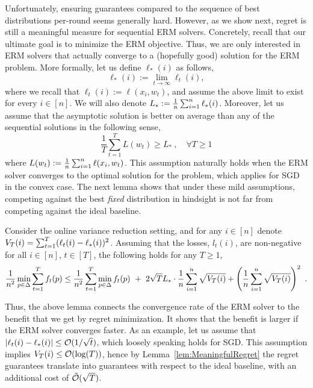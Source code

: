 Unfortunately, ensuring guarantees compared to the sequence of best distributions per-round seems generally hard.
However, as we show next, regret  is still a meaningful measure for sequential ERM solvers.
Concretely, recall that our ultimate goal is to minimize the ERM objective. Thus, we are only interested in ERM solvers that actually converge to a (hopefully good) solution for the ERM problem. More formally, let us define $\ell_*(i)$ as follows,
\begin{equation*}
 \ell_{*}(i):=\lim _{t\rightarrow \infty}\ell_t(i),
\end{equation*}
where we recall that $\ell_t(i) :=\ell(x_i,w_t)$, and assume the above  limit to exist for every $i\in[n]$.
We will also denote $L_*:= \frac{1}{n}\sum_{i=1}^n  \ell_{*}(i)$.
Moreover, let us assume that the asymptotic solution is better on average than any of the sequential solutions in the following sense,
\begin{equation*}
\frac{1}{T}\sum_{t=1}^T L(w_t) \geq L_*~,\quad \forall T\geq 1
\end{equation*}
where $L(w_t) := \frac{1}{n}\sum_{i=1}^n \ell(x_i,w_t)$.
This assumption naturally holds when the ERM solver converges to the optimal solution for the problem, which applies for SGD in the convex case.
The next lemma shows that under these mild assumptions,  competing against the best \emph{fixed}  distribution in hindsight is not  far from competing against the ideal baseline.%
\begin{lemma} \label{lem:MeaningfulRegret}
Consider the online variance reduction setting, and for any $i\in[n]$ denote \linebreak
$V_T(i)=\sum_{t=1}^T(\ell_t(i)-\ell_*(i))^2$. Assuming that the losses, $l_t(i)$, are non-negative for all $i \in [n]$, $t\in[T]$, 
 the following holds for any $T\geq 1$,
\begin{align*}
\frac{1}{n^2}\min_{p\in\Delta}\sum_{t=1}^T f_t(p) \leq 
\frac{1}{n^2}\sum_{t=1}^T \min_{p\in\Delta} f_t(p)
~+~
2\sqrt{T}L_* \cdot \frac{1}{n}\sum_{i=1}^n  \sqrt{{V_T(i)}} + \left(\frac{1}{n}\sum_{i=1}^n  \sqrt{{V_T(i)}} \right)^2~.
\end{align*}
\end{lemma}
Thus, the above lemma connects  the convergence rate of the ERM solver to  the benefit that we get by regret minimization. It shows that the benefit is larger if the ERM solver converges faster.
As an example, let us assume that $|\ell_t(i)-\ell_*(i)| \leq \mathcal{O}(1/\sqrt{t})$, which loosely speaking holds for  SGD.
This assumption implies $V_T(i)\leq \mathcal{O}(\log(T))$, hence by Lemma~\ref{lem:MeaningfulRegret} the regret guarantees translate into guarantees with respect to the ideal baseline, with an additional cost of $\tilde{\mathcal{O}}(\sqrt{T})$.


